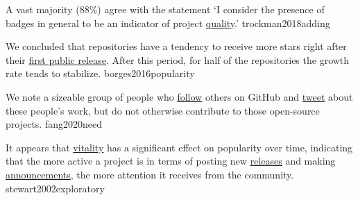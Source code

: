 \documentclass{article}
\begin{document}
  {A vast majority (88\%) agree with the statement `I consider the presence of badges in general to be an indicator of project \ul{quality}.'}
  {trockman2018adding}


  {We concluded that repositories have a tendency to receive more stars right after their \ul{first public release}. After this period, for half of the repositories the growth rate tends to stabilize.}
  {borges2016popularity}

  {We note a sizeable group of people who \ul{follow} others on GitHub and \ul{tweet} about these people’s work, but do not otherwise contribute to those open-source projects.}
  {fang2020need}


  {It appears that \ul{vitality} has a significant effect on popularity over time, indicating that the more active a project is in terms of posting new \ul{releases} and making \ul{announcements}, the more attention it receives from the community.}
  {stewart2002exploratory}


\end{document}
